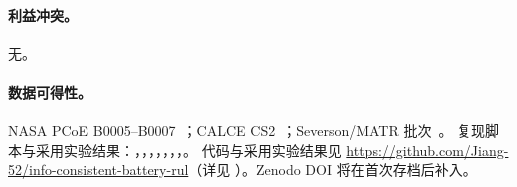 \documentclass[UTF8,a4paper,12pt]{ctexart}
\begin{document}
\paragraph{利益冲突。}无。
\paragraph{数据可得性。}
NASA PCoE B0005--B0007~\cite{saha2007nasa}；CALCE CS2~\cite{he2011calce}；Severson/MATR 批次~\cite{severson2019nature}。
复现脚本与采用实验结果：，，，，，，，。
代码与采用实验结果见 \url{https://github.com/Jiang-52/info-consistent-battery-rul}（详见 ）。Zenodo DOI 将在首次存档后补入。


\end{document}

